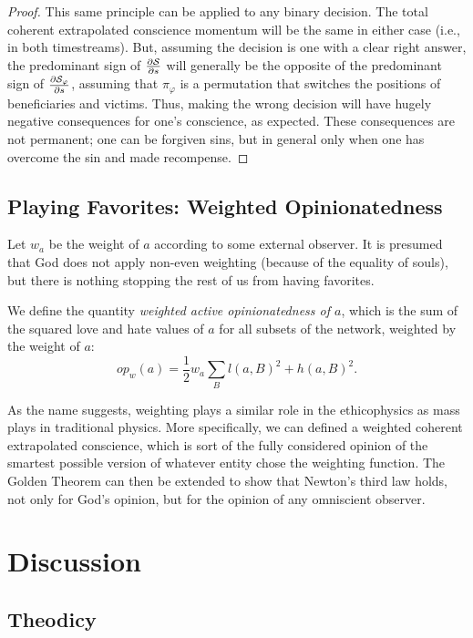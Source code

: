 \documentclass{article}
\begin{document}
\begin{proof}
This same principle can be applied to any binary decision. The total
coherent extrapolated conscience momentum will be the same in either
case (i.e., in both timestreams). But, assuming the decision is one
with a clear right answer, the predominant sign of $\frac{\partial
  {\mathcal S}}{\partial s}$ will generally be the opposite of the predominant
sign of $\frac{\partial {\mathcal S}_\varphi}{\partial s}$, assuming that
$\pi_\varphi$ is a permutation that switches the positions of
beneficiaries and victims. Thus, making the wrong decision will have
hugely negative consequences for one's conscience, as expected. These
consequences are not permanent; one can be forgiven sins, but in
general only when one has overcome the sin and made recompense.
  
\end{proof}

\subsection{Playing Favorites: Weighted Opinionatedness}

Let $w_a$ be the weight of $a$ according to some external observer. It
is presumed that God does not apply non-even weighting (because of the
equality of souls), but there is nothing stopping the rest of us from
having favorites.

We define the quantity {\em weighted active opinionatedness of $a$},
which is the sum of the squared love and hate values of $a$ for all
subsets of the network, weighted by the weight of $a$:
$$op_w(a) = \frac{1}{2} w_a \sum_B l(a, B)^2 + h(a, B)^2.$$ 

As the name suggests, weighting plays a similar role in the
ethicophysics as mass plays in traditional physics. More specifically,
we can defined a weighted coherent extrapolated conscience, which is
sort of the fully considered opinion of the smartest possible version
of whatever entity chose the weighting function. The Golden Theorem
can then be extended to show that Newton's third law holds, not only
for God's opinion, but for the opinion of any omniscient observer.

\section{Discussion}

\subsection{Theodicy}
\end{document}

